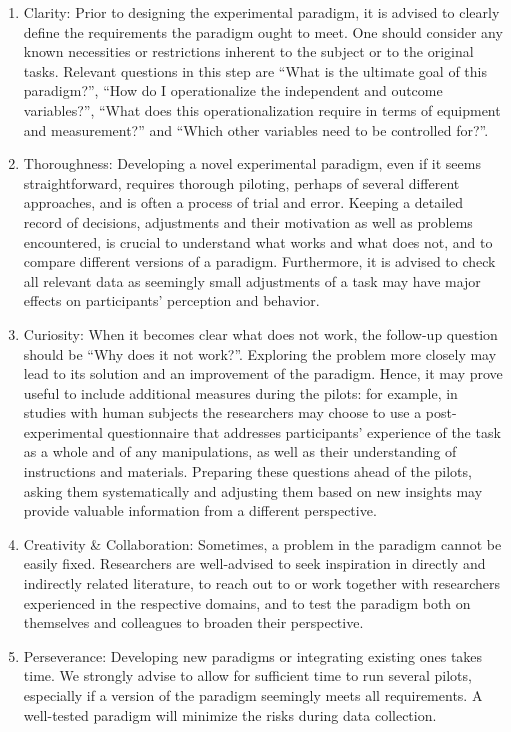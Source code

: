 \documentclass[twocolumn, serif, authordate, review]{jote-article}
\begin{document}
\begin{enumerate}
\item  Clarity: Prior to designing the experimental paradigm, it is advised to clearly define the requirements the paradigm ought to meet. One should consider any known necessities or restrictions inherent to the subject or to the original tasks. Relevant questions in this step are ``What is the ultimate goal of this paradigm?'', ``How do I operationalize the independent and outcome variables?'', ``What does this operationalization require in terms of equipment and measurement?'' and ``Which other variables need to be controlled for?''.

\item  Thoroughness: Developing a novel experimental paradigm, even if it seems straightforward, requires thorough piloting, perhaps of several different approaches, and is often a process of trial and error. Keeping a detailed record of decisions, adjustments and their motivation as well as problems encountered, is crucial to understand what works and what does not, and to compare different versions of a paradigm. Furthermore, it is advised to check all relevant data as seemingly small adjustments of a task may have major effects on participants' perception and behavior.

\item  Curiosity: When it becomes clear what does not work, the follow-up question should be ``Why does it not work?''. Exploring the problem more closely may lead to its solution and an improvement of the paradigm. Hence, it may prove useful to include additional measures during the pilots: for example, in studies with human subjects the researchers may choose to use a post-experimental questionnaire that addresses participants' experience of the task as a whole and of any manipulations, as well as their understanding of instructions and materials. Preparing these questions ahead of the pilots, asking them systematically and adjusting them based on new insights may provide valuable information from a different perspective.

\item  Creativity \& Collaboration: Sometimes, a problem in the paradigm cannot be easily fixed. Researchers are well-advised to seek inspiration in directly and indirectly related literature, to reach out to or work together with researchers experienced in the respective domains, and to test the paradigm both on themselves and colleagues to broaden their perspective.

\item  Perseverance: Developing new paradigms or integrating existing ones takes time. We strongly advise to allow for sufficient time to run several pilots, especially if a version of the paradigm seemingly meets all requirements. A well-tested paradigm will minimize the risks during data collection.
\end{enumerate}
\end{document}
